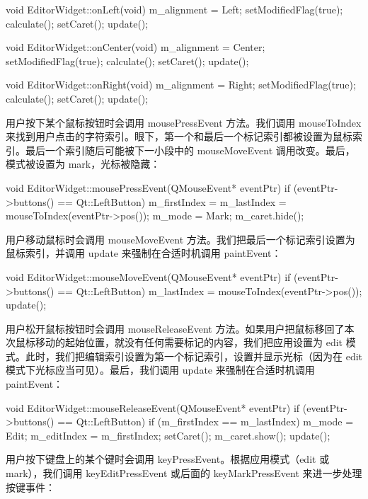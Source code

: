 \begin{codebox}
void EditorWidget::onLeft(void) {
  m_alignment = Left;
  setModifiedFlag(true);
  calculate();
  setCaret();
  update();
}

void EditorWidget::onCenter(void) {
  m_alignment = Center;
  setModifiedFlag(true);
  calculate();
  setCaret();
  update();
}

void EditorWidget::onRight(void) {
  m_alignment = Right;
  setModifiedFlag(true);
  calculate();
  setCaret();
  update();
}
\end{codebox}

用户按下某个鼠标按钮时会调用 mousePressEvent 方法。我们调用 mouseToIndex 来找到用户点击的字符索引。眼下，第一个和最后一个标记索引都被设置为鼠标索引。最后一个索引随后可能被下一小段中的 mouseMoveEvent 调用改变。最后，模式被设置为 mark，光标被隐藏：

\begin{codebox}
void EditorWidget::mousePressEvent(QMouseEvent* eventPtr) {
  if (eventPtr->buttons() == Qt::LeftButton) {
     m_firstIndex = m_lastIndex = mouseToIndex(eventPtr->pos());
     m_mode = Mark;
     m_caret.hide();
   }
}
\end{codebox}

用户移动鼠标时会调用 mouseMoveEvent 方法。我们把最后一个标记索引设置为鼠标索引，并调用 update 来强制在合适时机调用 paintEvent：

\begin{codebox}
void EditorWidget::mouseMoveEvent(QMouseEvent* eventPtr) {
  if (eventPtr->buttons() == Qt::LeftButton) {
     m_lastIndex = mouseToIndex(eventPtr->pos());
     update();
  }
}
\end{codebox}

用户松开鼠标按钮时会调用 mouseReleaseEvent 方法。如果用户把鼠标移回了本次鼠标移动的起始位置，就没有任何需要标记的内容，我们把应用设置为 edit 模式。此时，我们把编辑索引设置为第一个标记索引，设置并显示光标（因为在 edit 模式下光标应当可见）。最后，我们调用 update 来强制在合适时机调用 paintEvent：

\begin{codebox}
void EditorWidget::mouseReleaseEvent(QMouseEvent* eventPtr) {
  if (eventPtr->buttons() == Qt::LeftButton) {
    if (m_firstIndex == m_lastIndex) {
      m_mode = Edit;
      m_editIndex = m_firstIndex;
      setCaret();
      m_caret.show();
      update();
    }
  }
}
\end{codebox}

用户按下键盘上的某个键时会调用 keyPressEvent。根据应用模式（edit 或 mark），我们调用 keyEditPressEvent 或后面的 keyMarkPressEvent 来进一步处理按键事件：

